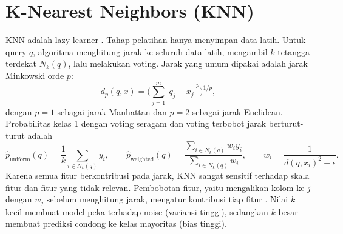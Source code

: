 \section{K-Nearest Neighbors (KNN)}
KNN adalah lazy learner \cite{ref:knn,ref:cunningham}. Tahap pelatihan hanya menyimpan data latih. Untuk query $q$, algoritma menghitung jarak ke seluruh data latih, mengambil $k$ tetangga terdekat $N_k(q)$, lalu melakukan voting. Jarak yang umum dipakai adalah jarak Minkowski orde $p$:
\begin{equation}
  d_p(q,x) = \Big(\sum_{j=1}^{m} |q_j - x_j|^{p}\Big)^{1/p},
\end{equation}
dengan $p=1$ sebagai jarak Manhattan dan $p=2$ sebagai jarak Euclidean. Probabilitas kelas 1 dengan voting seragam dan voting terbobot jarak berturut-turut adalah
\begin{equation}
  \hat{p}_{\text{uniform}}(q) = \frac{1}{k}\sum_{i\in N_k(q)} y_i, \qquad
  \hat{p}_{\text{weighted}}(q) = \frac{\sum_{i\in N_k(q)} w_i y_i}{\sum_{i\in N_k(q)} w_i}, \qquad w_i = \frac{1}{d(q,x_i)^2 + \epsilon}.
\end{equation}
Karena semua fitur berkontribusi pada jarak, KNN sangat sensitif terhadap skala fitur dan fitur yang tidak relevan. Pembobotan fitur, yaitu mengalikan kolom ke-$j$ dengan $w_j$ sebelum menghitung jarak, mengatur kontribusi tiap fitur \cite{ref:wettschereck}. Nilai $k$ kecil membuat model peka terhadap noise (variansi tinggi), sedangkan $k$ besar membuat prediksi condong ke kelas mayoritas (bias tinggi).

